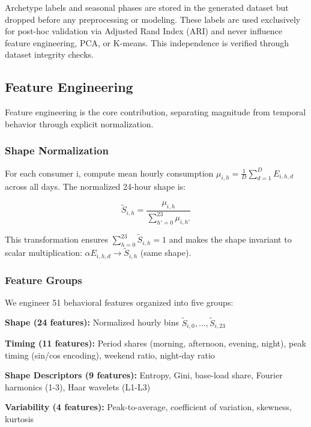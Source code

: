 \documentclass[11pt,a4paper]{article}
\begin{document}
Archetype labels and seasonal phases are stored in the generated dataset but dropped before any preprocessing or modeling. These labels are used exclusively for post-hoc validation via Adjusted Rand Index (ARI) and never influence feature engineering, PCA, or K-means. This independence is verified through dataset integrity checks.

\subsection{Feature Engineering}
\label{sec:features}

Feature engineering is the core contribution, separating magnitude from temporal behavior through explicit normalization.

\subsubsection{Shape Normalization}

For each consumer i, compute mean hourly consumption $\mu_{i,h} = \frac{1}{D} \sum_{d=1}^{D} E_{i,h,d}$ across all days. The normalized 24-hour shape is:

\begin{equation}
\tilde{S}_{i,h} = \frac{\mu_{i,h}}{\sum_{h'=0}^{23} \mu_{i,h'}}
\label{eq:shape_normalization}
\end{equation}

This transformation ensures $\sum_{h=0}^{23} \tilde{S}_{i,h} = 1$ and makes the shape invariant to scalar multiplication: $\alpha E_{i,h,d} \rightarrow \tilde{S}_{i,h}$ (same shape).

\subsubsection{Feature Groups}

We engineer 51 behavioral features organized into five groups:

\textbf{Shape (24 features):} Normalized hourly bins $\tilde{S}_{i,0}, \ldots, \tilde{S}_{i,23}$

\textbf{Timing (11 features):} Period shares (morning, afternoon, evening, night), peak timing (sin/cos encoding), weekend ratio, night-day ratio

\textbf{Shape Descriptors (9 features):} Entropy, Gini, base-load share, Fourier harmonics (1-3), Haar wavelets (L1-L3)

\textbf{Variability (4 features):} Peak-to-average, coefficient of variation, skewness, kurtosis
\end{document}
